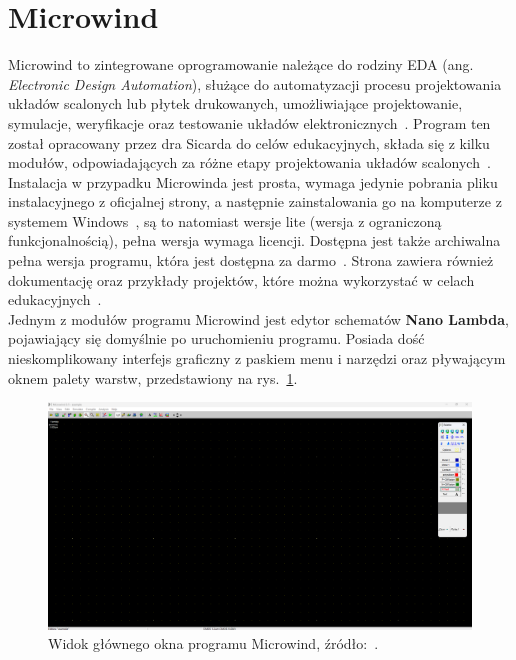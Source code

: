 \section{Microwind}

Microwind to zintegrowane oprogramowanie należące do rodziny EDA (ang. \textit{Electronic Design Automation}),
służące do automatyzacji procesu projektowania układów scalonych lub płytek drukowanych,
umożliwiające projektowanie, symulacje, weryfikacje oraz testowanie układów elektronicznych~\cite{eda}.
Program ten został opracowany przez dra Sicarda do celów edukacyjnych, składa się z kilku modułów,
odpowiadających za różne etapy projektowania układów scalonych~\cite{Microwind}.
Instalacja w przypadku Microwinda jest prosta, wymaga jedynie pobrania pliku instalacyjnego z oficjalnej strony,
a następnie zainstalowania go na komputerze z systemem Windows~\cite{Microwind},
są to natomiast wersje lite (wersja z ograniczoną funkcjonalnością), pełna wersja wymaga licencji.
Dostępna jest także archiwalna pełna wersja programu, która jest dostępna za darmo~\cite{old_microwind}.
Strona zawiera również dokumentację oraz przykłady projektów,
które można wykorzystać w celach edukacyjnych~\cite{Microwind}.\\
\indent Jednym z modułów programu Microwind jest edytor schematów \textbf{Nano Lambda},
pojawiający się domyślnie po uruchomieniu programu.
Posiada dość nieskomplikowany interfejs graficzny z paskiem menu i narzędzi
oraz pływającym oknem palety warstw, przedstawiony na rys.~\ref{fig:microwind_okno}.

\begin{figure}[h]
    \centering
    \includegraphics[width=.9\textwidth]{chapters/chapter2/img/microwind_okno}
    \caption[Widok głównego okna programu Microwind.]{Widok głównego okna programu Microwind, źródło:~\cite{Microwind}.}
    \label{fig:microwind_okno}
\end{figure}

